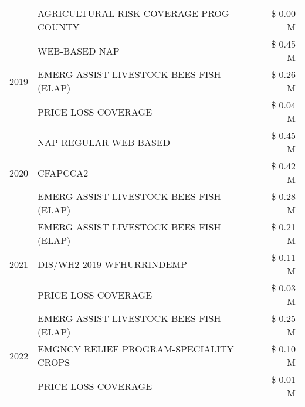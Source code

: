 \begin{tabular}{llr}
 & AGRICULTURAL RISK COVERAGE PROG - COUNTY & \$ 0.00 M \\
\cline{1-3}
\multirow[t]{3}{*}{2019} & WEB-BASED NAP & \$ 0.45 M \\
 & EMERG ASSIST LIVESTOCK BEES FISH (ELAP) & \$ 0.26 M \\
 & PRICE LOSS COVERAGE & \$ 0.04 M \\
\cline{1-3}
\multirow[t]{3}{*}{2020} & NAP REGULAR WEB-BASED & \$ 0.45 M \\
 & CFAPCCA2 & \$ 0.42 M \\
 & EMERG ASSIST LIVESTOCK BEES FISH (ELAP) & \$ 0.28 M \\
\cline{1-3}
\multirow[t]{3}{*}{2021} & EMERG ASSIST LIVESTOCK BEES FISH (ELAP) & \$ 0.21 M \\
 & DIS/WH2 2019 WFHURRINDEMP & \$ 0.11 M \\
 & PRICE LOSS COVERAGE & \$ 0.03 M \\
\cline{1-3}
\multirow[t]{3}{*}{2022} & EMERG ASSIST LIVESTOCK BEES FISH (ELAP) & \$ 0.25 M \\
 & EMGNCY RELIEF PROGRAM-SPECIALITY CROPS & \$ 0.10 M \\
 & PRICE LOSS COVERAGE & \$ 0.01 M \\
\cline{1-3}
\bottomrule
\end{tabular}
